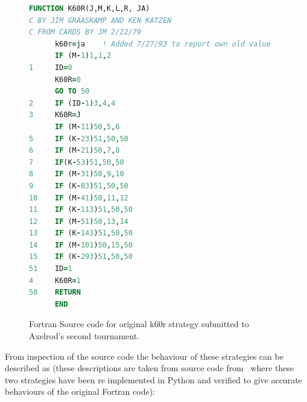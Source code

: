 \documentclass{article}
\begin{document}
\begin{figure}[!hbtp]
    \begin{center}
        \begin{lstlisting}[language=Fortran,
                           basicstyle=\ttfamily,
                           frame=single,
                           keywordstyle=\color{red},
                           commentstyle=\color{green}]
      FUNCTION K60R(J,M,K,L,R, JA)
C BY JIM GRAASKAMP AND KEN KATZEN
C FROM CARDS BY JM 2/22/79
      k60r=ja    ! Added 7/27/93 to report own old value
      IF (M-1)1,1,2
1     ID=0
      K60R=0
      GO TO 50
2     IF (ID-1)3,4,4
3     K60R=J
      IF (M-11)50,5,6
5     IF (K-23)51,50,50
6     IF (M-21)50,7,8
7     IF(K-53)51,50,50
8     IF (M-31)50,9,10
9     IF (K-83)51,50,50
10    IF (M-41)50,11,12
11    IF (K-113)51,50,50
12    IF (M-51)50,13,14
13    IF (K-143)51,50,50
14    IF (M-101)50,15,50
15    IF (K-293)51,50,50
51    ID=1
4     K60R=1
50    RETURN
      END
        \end{lstlisting}
        \caption{Fortran Source code for original k60r strategy submitted
        to Axelrod's second tournament.}
        \label{fig:tft_60r}
    \end{center}
\end{figure}

From inspection of the source code the behaviour of these strategies can be
described as (these descriptions are taken from source code
from~\cite{AxelrodProject} where these two strategies have been re implemented
in Python and verified to give accurate behaviours of the original Fortran
code):
\end{document}
